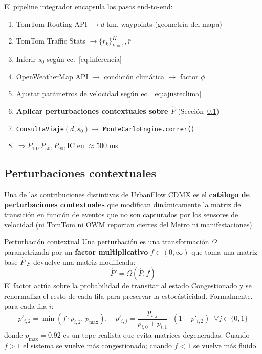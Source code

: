 \documentclass[11pt,a4paper]{article}
\begin{document}
El pipeline integrador encapsula los pasos end-to-end:
\begin{enumerate}[leftmargin=*]
\item TomTom Routing API $\to d$ km, waypoints (geometría del mapa)
\item TomTom Traffic Stats $\to \{r_k\}_{k=1}^{K}, \bar{r}$
\item Inferir $s_0$ según ec.~\eqref{eq:inferencia}
\item OpenWeatherMap API $\to$ condición climática $\to$ factor $\phi$
\item Ajustar parámetros de velocidad según ec.~\eqref{eq:ajusteclima}
\item \textbf{Aplicar perturbaciones contextuales sobre $\hat{P}$} (Sección~\ref{sec:perturbaciones})
\item \texttt{ConsultaViaje}$(d, s_0) \to$ \texttt{MonteCarloEngine.correr()}
\item $\Rightarrow P_{10}, P_{50}, P_{90}, \text{IC}$ en $\approx 500$ ms
\end{enumerate}

\subsection{Perturbaciones contextuales}
\label{sec:perturbaciones}

Una de las contribuciones distintivas de UrbanFlow CDMX es el \textbf{catálogo de perturbaciones contextuales} que modifican dinámicamente la matriz de transición en función de eventos que no son capturados por los sensores de velocidad (ni TomTom ni OWM reportan cierres del Metro ni manifestaciones).

\begin{defbox}{Perturbación contextual}
Una perturbación es una transformación $\Omega$ parametrizada por un \textbf{factor multiplicativo} $f \in (0, \infty)$ que toma una matriz base $\hat{P}$ y devuelve una matriz modificada:
\begin{equation}
\hat{P}' = \Omega(\hat{P}, f)
\label{eq:perturbacion}
\end{equation}
El factor actúa sobre la probabilidad de transitar al estado Congestionado y se renormaliza el resto de cada fila para preservar la estocásticidad. Formalmente, para cada fila $i$:
\begin{equation}
p'_{i,2} = \min(f \cdot p_{i,2}, \, p_{\max}), \quad p'_{i,j} = \frac{p_{i,j}}{p_{i,0}+p_{i,1}} \cdot (1 - p'_{i,2}) \;\; \forall j \in \{0,1\}
\label{eq:perturbacion_formula}
\end{equation}
donde $p_{\max} = 0.92$ es un tope realista que evita matrices degeneradas. Cuando $f > 1$ el sistema se vuelve más congestionado; cuando $f < 1$ se vuelve más fluido.
\end{defbox}
\end{document}
